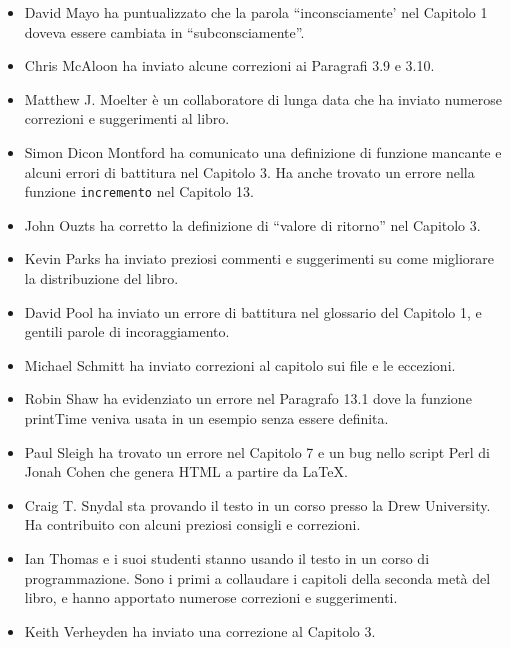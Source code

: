 \documentclass[10pt]{book}
\begin{document}
\begin{itemize}
\item David Mayo ha puntualizzato che la parola ``inconsciamente' nel Capitolo 1 doveva essere cambiata in ``subconsciamente''.

\item Chris McAloon ha inviato alcune correzioni ai Paragrafi 3.9 e
3.10.

\item Matthew J. Moelter è un collaboratore di lunga data che ha inviato numerose correzioni e suggerimenti al libro.  

\item Simon Dicon Montford ha comunicato una definizione di funzione mancante e alcuni errori di battitura nel Capitolo 3. Ha anche trovato un errore nella funzione {\tt incremento} nel Capitolo 13.

\item John Ouzts ha corretto la definizione di ``valore di ritorno'' nel Capitolo 3.

\item Kevin Parks ha inviato preziosi commenti e suggerimenti su come migliorare la distribuzione del libro.

\item David Pool ha inviato un errore di battitura nel glossario del Capitolo 1, e gentili parole di incoraggiamento.

\item Michael Schmitt ha inviato correzioni al capitolo sui file e le eccezioni.

\item Robin Shaw ha evidenziato un errore nel Paragrafo 13.1 dove la funzione printTime veniva usata in un esempio senza essere definita.

\item Paul Sleigh ha trovato un errore nel Capitolo 7 e un bug nello script Perl di Jonah Cohen che genera HTML a partire da LaTeX.

\item Craig T. Snydal sta provando il testo in un corso presso la Drew
University. Ha contribuito con alcuni preziosi consigli e correzioni.

\item Ian Thomas e i suoi studenti stanno usando il testo in un corso di programmazione. Sono i primi a collaudare i capitoli della seconda metà del libro, e hanno apportato numerose correzioni e suggerimenti.

\item Keith Verheyden ha inviato una correzione al Capitolo 3.


\end{itemize}
\end{document}
